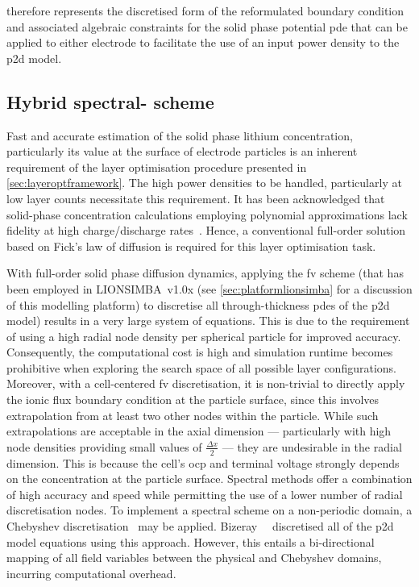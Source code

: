      therefore represents
    the discretised form  of the reformulated boundary  condition and associated
    algebraic constraints  for the solid  phase potential \gls{pde} that  can be
    applied to either electrode to facilitate  the use of an input power density
    to the \gls{p2d} model.

    \subsection{Hybrid spectral- scheme}\label{sec:hybridfv-spectral}

    Fast  and accurate  estimation  of the  solid  phase lithium  concentration,
    particularly  its  value  at  the  surface  of  electrode  particles  is  an
    inherent  requirement  of  the  layer optimisation  procedure  presented  in
    \cref{sec:layeroptframework}.  The  high  power  densities  to  be  handled,
    particularly  at  low layer  counts  necessitate  this requirement.  It  has
    been  acknowledged  that  solid-phase concentration  calculations  employing
    polynomial   approximations   lack   fidelity   at   high   charge/discharge
    rates~\cite{Santhanagopalan2006}. Hence, a  conventional full-order solution
    based on  Fick's law of  diffusion is  required for this  layer optimisation
    task.

    With full-order solid phase diffusion dynamics, applying the \gls{fv} scheme
    (that has been employed in LIONSIMBA~v1.0x (see \cref{sec:platformlionsimba}
    for   a  discussion   of  this   modelling  platform)   to  discretise   all
    through-thickness \gls{pde}s of the \gls{p2d} model) results in a very large
    system of equations. This  is due to the requirement of  using a high radial
    node density per spherical particle for improved accuracy. Consequently, the
    computational cost is  high and simulation runtime  becomes prohibitive when
    exploring the search  space of all possible  layer configurations. Moreover,
    with a cell-centered \gls{fv} discretisation,  it is non-trivial to directly
    apply  the ionic  flux boundary  condition  at the  particle surface,  since
    this  involves  extrapolation from  at  least  two  other nodes  within  the
    particle. While  such extrapolations are  acceptable in the  axial dimension
    ---  particularly  with  high  node  densities  providing  small  values  of
    $\frac{\Delta x}{2}$ --- they are  undesirable in the radial dimension. This
    is because the cell's \gls{ocp} and terminal voltage strongly depends on the
    concentration at the particle surface.  Spectral methods offer a combination
    of  high accuracy  and speed  while  permitting the  use of  a lower  number
    of  radial  discretisation  nodes.  To  implement a  spectral  scheme  on  a
    non-periodic domain, a  Chebyshev discretisation~\cite{Trefethen2000} may be
    applied. Bizeray~\etal{}~\cite{Bizeray2015} discretised all of the \gls{p2d}
    model equations using this approach.  However, this entails a bi-directional
    mapping of all  field variables between the physical  and Chebyshev domains,
    incurring computational overhead.

